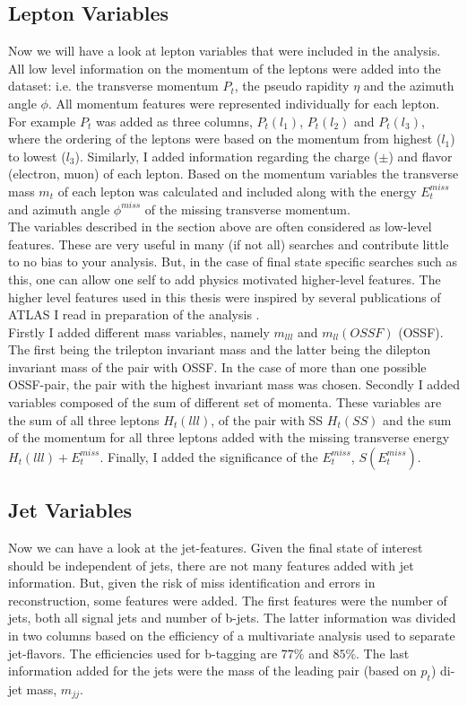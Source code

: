 \subsection{Lepton Variables}\label{subsec:LepSel}
Now we will have a look at lepton variables that were included in the analysis. All low level information on the
momentum of the leptons were added into the dataset: i.e. the transverse momentum $P_t$, the pseudo rapidity $\eta$ and the azimuth
angle $\phi$. All momentum features were represented individually for each lepton. For example $P_t$ was added as three columns, $P_t(l_1)$,
$P_t(l_2)$ and $P_t(l_3)$, where the ordering of the leptons were based on the momentum from highest ($l_1$) to lowest ($l_3$).
Similarly, I added information regarding the charge ($\pm$) and flavor (electron, muon) of each lepton. Based on the momentum variables
the transverse mass $m_t$ of each lepton was calculated and included along with the energy $E_t^{miss}$ and azimuth angle $\phi^{miss}$ 
of the missing transverse momentum.
\\
The variables described in the section above are often considered as low-level features. These are very useful in many (if not all)
searches and contribute little to no bias to your analysis. But, in the case of final state specific searches such as this,
one can allow one self to add physics motivated higher-level features. The higher level features used in this thesis
were inspired by several publications of \ac{ATLAS} I read in preparation of the analysis \cite{franchini_search_2019, atlas_search_2021}. 
\\
Firstly I added different mass variables, namely $m_{lll}$ and $m_{ll}(OSSF)$ (\ac{OSSF}). The first being the trilepton invariant mass 
and the latter being the dilepton invariant mass of the pair with \ac{OSSF}. In the case of more than one possible OSSF-pair,
the pair with the highest invariant mass was chosen. Secondly I added variables composed of the sum of different set of momenta.
These variables are the sum of all three leptons $H_t(lll)$, of the pair with \ac{SS} $H_t(SS)$ and the sum of the momentum
for all three leptons added with the missing transverse energy $H_t(lll) + E_t^{miss}$. Finally, I added the significance of the
$E_t^{miss}$, $S(E_t^{miss})$.
\subsection{Jet Variables}\label{subsec:JetSel}
Now we can have a look at the jet-features. Given the final state of interest should be independent of jets, there are not many
features added with jet information. But, given the risk of miss identification and errors in reconstruction, some features were 
added. The first features were the number of jets, both all signal jets and number of b-jets.
The latter information was divided in two columns based on the efficiency of a multivariate analysis used to separate jet-flavors.
The efficiencies used for b-tagging are $77\%$ and $85\%$. The last information added for the jets were the mass of the leading pair 
(based on $p_t$) di-jet mass, $m_{jj}$.
